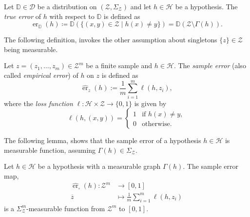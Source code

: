 \begin{definition}
    Let $\mathbb{D} \in \mathcal{D}$ be a distribution on $(\mathcal{Z},\Sigma_{\mathcal{Z}})$
    and let $h \in \mathcal{H}$ be a hypothesis.
    The \emph{true error} of $h$ with respect to $\mathbb{D}$ is defined as
    \[
        \operatorname{er}_{\mathbb{D}}(h) \coloneqq \mathbb{D}(\{(x,y)\in\mathcal{Z} \mid h(x)\neq y\}) = \mathbb{D}(\mathcal{Z}\setminus\Gamma(h)).
    \]
\end{definition}


\medskip

The following definition, invokes the other assumption about singletons $\{z\}\in \mathcal{Z}$ being measurable.

\begin{definition}
    Let $z = (z_1,\dots,z_m)\in\mathcal{Z}^m$ be a finite sample and $h\in\mathcal{H}$.
    The \emph{sample error} (also called \emph{empirical error}) of $h$ on $z$ is defined as
    \[
        \hat{\operatorname{er}}_{z}(h) := \frac{1}{m}\sum_{i=1}^m \ell(h,z_i),
    \]
    where the \emph{loss function} $\ell:\mathcal{H}\times \mathcal{Z}\to\{0,1\}$ is given by
    \[
        \ell(h,(x,y)) =
        \begin{cases}
            1 & \text{if } h(x)\neq y, \\
            0 & \text{otherwise}.
        \end{cases}
    \]
\end{definition}

The following lemma, shows that the sample error of a hypothesis $h \in \mathcal{H}$ is measurable function, assuming $\Gamma(h) \in \Sigma_{\mathcal{Z}}$.

\begin{lemma}
    \label{lem:sample-error-measurable}
    Let $h \in \mathcal{H}$ be a hypothesis with a measurable graph $\Gamma(h)$. The sample error map,
    \[
        \begin{aligned}
            \hat{\operatorname{er}}_{\square}(h): \mathcal{Z}^m &\to [0, 1]\\
            \overline{z} &\mapsto \frac{1}{m}\sum_{i=1}^m \ell(h,z_i)
        \end{aligned}
    \]
    is a $\Sigma_{\mathcal{Z}}^m$-measurable function from $\mathcal{Z}^m$ to $[0,1]$.
\end{lemma}


